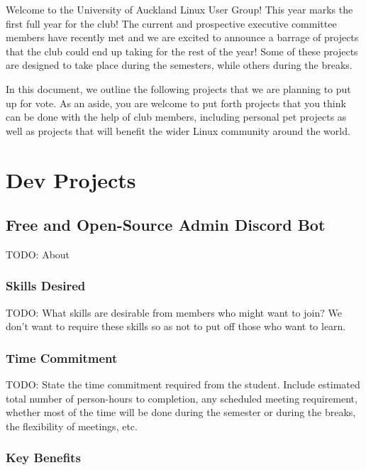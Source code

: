 \documentclass[11pt,fleqn]{article}
\begin{document}
\newpage

Welcome to the University of Auckland Linux User Group!  This year marks the first full year for the club!  The current and prospective executive committee members have recently met and we are excited to announce a barrage of projects that the club could end up taking for the rest of the year!  Some of these projects are designed to take place during the semesters, while others during the breaks.

In this document, we outline the following projects that we are planning to put up for vote.  As an aside, you are welcome to put forth projects that you think can be done with the help of club members, including personal pet projects as well as projects that will benefit the wider Linux community around the world.

\tableofcontents

\newpage

\section{Dev Projects}

\subsection{Free and Open-Source Admin Discord Bot}

TODO: About

\subsubsection*{Skills Desired}

TODO: What skills are desirable from members who might want to join?  We don't want to require these skills so as not to put off those who want to learn.

\subsubsection*{Time Commitment}

TODO: State the time commitment required from the student.  Include estimated total number of person-hours to completion, any scheduled meeting requirement, whether most of the time will be done during the semester or during the breaks, the flexibility of meetings, etc.

\subsubsection*{Key Benefits}
\end{document}
